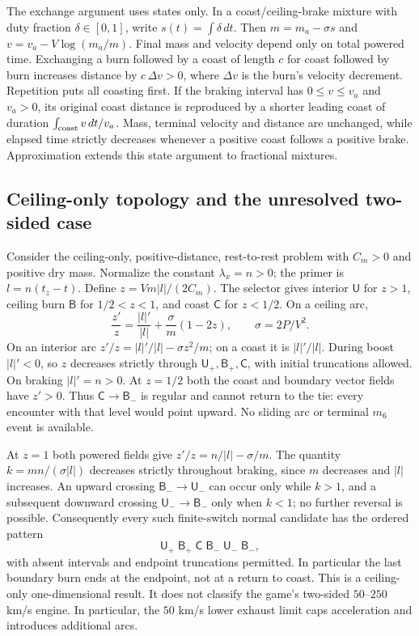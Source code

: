 The exchange argument uses states only. In a
coast/ceiling-brake mixture with duty fraction $\delta\in[0,1]$, write
$s(t)=\int\delta\,dt$. Then $m=m_a-\sigma s$ and
$v=v_a-V\log(m_a/m)$. Final mass and velocity depend only on total
powered time. Exchanging a burn followed by a coast of length $c$ for
coast followed by burn increases distance by $c\,\Delta v>0$, where
$\Delta v$ is the burn's velocity decrement. Repetition puts all coasting
first. If the braking interval has $0\le v\le v_a$ and $v_a>0$, its
original coast distance is reproduced by a shorter leading coast of
duration $\int_{\rm coast}v\,dt/v_a$. Mass, terminal velocity and distance
are unchanged, while elapsed time strictly decreases whenever a positive
coast follows a positive brake. Approximation extends this state argument
to fractional mixtures.

\subsection{Ceiling-only topology and the unresolved two-sided case}
Consider the ceiling-only, positive-distance, rest-to-rest problem with
$C_m>0$ and positive dry mass. Normalize the constant $\lambda_x=n>0$;
the primer is $l=n(t_z-t)$. Define
$z=Vm|l|/(2C_m)$. The selector gives interior $\mathsf U$ for $z>1$,
ceiling burn $\mathsf B$ for $1/2<z<1$, and coast $\mathsf C$ for $z<1/2$.
On a ceiling arc,
\begin{equation}
 \frac{z'}z=\frac{|l|'}{|l|}+\frac{\sigma}{m}(1-2z),
 \qquad \sigma=2P/V^2.
\end{equation}
On an interior arc $z'/z=|l|'/|l|-\sigma z^2/m$; on a coast it is
$|l|'/|l|$. During boost $|l|'<0$, so $z$ decreases strictly through
$\mathsf U_+,\mathsf B_+,\mathsf C$, with initial truncations allowed.
On braking $|l|'=n>0$. At $z=1/2$ both the coast and boundary vector
fields have $z'>0$. Thus $\mathsf C\to\mathsf B_-$ is regular and cannot
return to the tie: every encounter with that level would point upward.
No sliding arc or terminal $m_6$ event is available.

At $z=1$ both powered fields give
$z'/z=n/|l|-\sigma/m$. The quantity
$k=mn/(\sigma|l|)$ decreases strictly throughout braking, since $m$
decreases and $|l|$ increases. An upward crossing $\mathsf B_-\to\mathsf U_-$
can occur only while $k>1$, and a subsequent downward crossing
$\mathsf U_-\to\mathsf B_-$ only when $k<1$; no further reversal is
possible. Consequently every such finite-switch normal candidate has
the ordered pattern
\begin{equation}
 \mathsf U_+\;\mathsf B_+\;\mathsf C\;\mathsf B_-\;
 \mathsf U_-\;\mathsf B_-,
\end{equation}
with absent intervals and endpoint truncations permitted. In particular
the last boundary burn ends at the endpoint, not at a return to coast.
This is a ceiling-only one-dimensional result. It does not classify the
game's two-sided $50$--$250$ km/s engine. In particular, the $50$ km/s
lower exhaust limit caps acceleration and introduces additional arcs.

